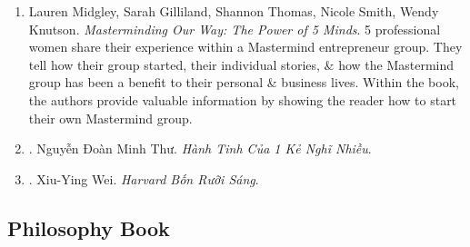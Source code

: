\documentclass{article}
\begin{document}
\begin{enumerate}
	\item {\sc Lauren Midgley, Sarah Gilliland, Shannon Thomas, Nicole Smith, Wendy Knutson}. {\it Masterminding Our Way: The Power of 5 Minds}. 5 professional women share their experience within a Mastermind entrepreneur group. They tell how their group started, their individual stories, \& how the Mastermind group has been a benefit to their personal \& business lives. Within the book, the authors provide valuable information by showing the reader how to start their own Mastermind group. {}
	
	\item \cite{Thu_overthink}. {\sc Nguyễn Đoàn Minh Thư}. {\it Hành Tinh Của 1  Kẻ Nghĩ Nhiều}.\hfill{\sf[done]}
	
	\item \cite{Wei_Harvard_VN}. {\sc Xiu-Ying Wei}. {\it Harvard Bốn Rưỡi Sáng}.\hfill{\sf[done]}
\end{enumerate}


\subsection{Philosophy Book}
\end{document}
